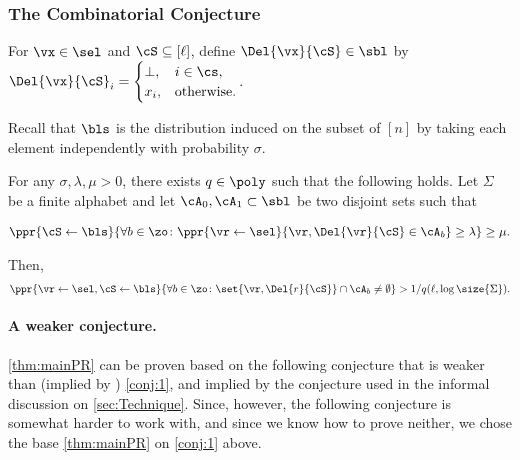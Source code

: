 

\subsubsection{The Combinatorial Conjecture}\label{sec:CombinatorialConjectures}


\begin{notation}
For $\vx\in \sel$ and $\cS \subseteq [\ell]$, define  $\Del{\vx}{\cS} \in \sbl$ by $
\Del{\vx}{\cS}_i=
\begin{cases}
\bot, & i\in \cs,\\
x_i, & \text{otherwise}.
\end{cases}
$.%
\end{notation}
	

Recall that  $\bls$ is the distribution induced on the subset of $[n]$ by taking each element independently with probability $\sigma$.	
\begin{conjecture}\label{conj:1}
For any $\sigma,\lambda, \mu>0$, there exists $q \in \poly$ such that the following holds.  Let  $\Sigma$ be a finite alphabet and let $\cA_0,\cA_1 \subset \sbl$  be  two disjoint sets such that %

\begin{align*}%
\ppr{\cS \gets \bls}{\forall b\in \zo \colon \ppr{\vr\gets \sel}{\vr, \Del{\vr}{\cS} \in \cA_b} \ge \lambda} \ge \mu.
\end{align*}
		
Then,
\begin{align*}%
\ppr{\vr\gets \sel,\cS \gets \bls}{\forall b\in \zo\colon \set{\vr, \Del{r}{\cS}} \cap \cA_b \neq \emptyset} > 1/q(\ell,\log\size{\Sigma}).
\end{align*}
\end{conjecture}


\paragraph{A weaker conjecture.}
\cref{thm:mainPR} can be proven based on the following conjecture that is  weaker  than  (\ie implied by ) \cref{conj:1}, and implied by the conjecture used in the informal discussion on  \cref{sec:Technique}. Since, however,  the following conjecture is somewhat  harder to work with, and since we know how to prove neither, we chose the base \cref{thm:mainPR}  on   \cref{conj:1} above.

